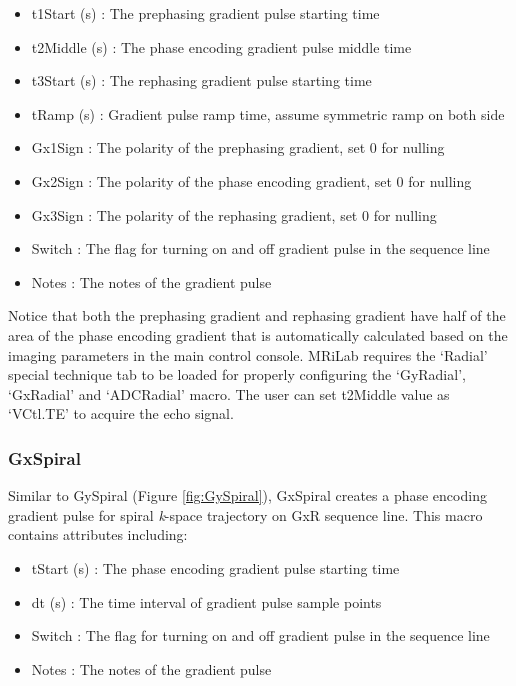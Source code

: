 \documentclass{book}%
\begin{document}
\begin{itemize}
	\item t1Start (s) : The prephasing gradient pulse starting time
	\item t2Middle (s) : The phase encoding gradient pulse middle time
	\item t3Start (s) : The rephasing gradient pulse starting time
	\item tRamp (s) : Gradient pulse ramp time, assume symmetric ramp on both side
	\item Gx1Sign : The polarity of the prephasing gradient, set 0 for nulling
	\item Gx2Sign : The polarity of the phase encoding gradient, set 0 for nulling
  \item Gx3Sign : The polarity of the rephasing gradient, set 0 for nulling
	\item Switch : The flag for turning on and off gradient pulse in the sequence line
	\item Notes : The notes of the gradient pulse 
\end{itemize}

Notice that both the prephasing gradient and rephasing gradient have half of the area of the phase encoding gradient that is automatically calculated based on the imaging parameters in the main control console. MRiLab requires the `Radial' special technique tab to be loaded for properly configuring the `GyRadial', `GxRadial' and `ADCRadial' macro. The user can set t2Middle value as `VCtl.TE' to acquire the echo signal.

\subsubsection{GxSpiral}

Similar to GySpiral (Figure \ref{fig:GySpiral}), GxSpiral creates a phase encoding gradient pulse for spiral \textit{k}-space trajectory on GxR sequence line. This macro contains attributes including:

\begin{itemize}
	\item tStart (s) : The phase encoding gradient pulse starting time
	\item dt (s) : The time interval of gradient pulse sample points
	\item Switch : The flag for turning on and off gradient pulse in the sequence line
	\item Notes : The notes of the gradient pulse 
\end{itemize}
\end{document}
